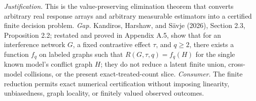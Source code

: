 \documentclass{article}
\begin{document}
\par\smallskip\noindent \textit{Justification.} This is the value-preserving elimination theorem that converts arbitrary real response arrays and arbitrary measurable estimators into a certified finite decision problem. \textit{Gap.} Kandiros, Harshaw, and Sävje (2026), Section 2.3, Proposition 2.2; restated and proved in Appendix A.5, show that for an interference network \(G\), a fixed contrastive effect \(\tau\), and \(q\ge2\), there exists a function \(f_q\) on labeled graphs such that \(R(G,\tau,q)=f_q(H)\) for the single known model's conflict graph \(H\); they do not reduce a latent finite union, cross-model collisions, or the present exact-treated-count slice. \textit{Consumer.} The finite reduction permits exact numerical certification without imposing linearity, unbiasedness, graph locality, or finitely valued observed outcomes.
\end{document}

